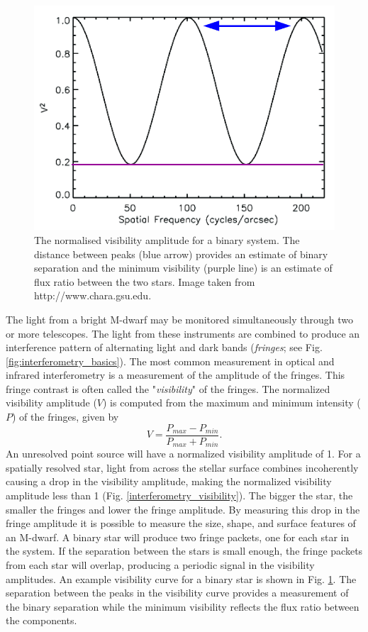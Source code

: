     
    \begin{figure}
    \includegraphics[width=\textwidth]{3-images/vis_binary}
    \caption{The normalised visibility amplitude for a binary system. The distance between peaks (blue arrow) provides an estimate of binary separation and the minimum visibility (purple line) is an estimate of flux ratio between the two stars. Image taken from http://www.chara.gsu.edu.}
    \label{fig:interferometry_binary}
    \end{figure}
    
    The light from a bright M-dwarf may be monitored simultaneously through two or more telescopes. The light from these instruments are combined to produce an interference pattern of alternating light and dark bands (\textit{fringes}; see Fig. \ref{fig:interferometry_basics}). The most common measurement in optical and infrared interferometry is a measurement of the amplitude of the fringes. This fringe contrast is often called the "\textit{visibility}" of the fringes.  The normalized visibility amplitude ($V$) is computed from the maximum and minimum intensity ($P$) of the fringes, given by
    \begin{equation}
    V = \frac{P_{max} - P_{min}}{P_{max} + P_{min}}.
    \end{equation}
    An unresolved point source will have a normalized visibility amplitude of 1.  For a spatially resolved star, light from across the stellar surface combines incoherently causing a drop in the visibility amplitude, making the normalized visibility amplitude less than 1 (Fig. \ref{interferometry_visibility}).  The bigger the star, the smaller the fringes and lower the fringe amplitude.  By measuring this drop in the fringe amplitude it is possible to measure the size, shape, and surface features of an M-dwarf. A binary star will produce two fringe packets, one for each star in the system.  If the separation between the stars is small enough, the fringe packets from each star will overlap, producing a periodic signal in the visibility amplitudes.  An example visibility curve for a binary star is shown in Fig. \ref{fig:interferometry_binary}.  The separation between the peaks in the visibility curve provides a measurement of the binary separation while the minimum visibility reflects the flux ratio between the components. 
    
